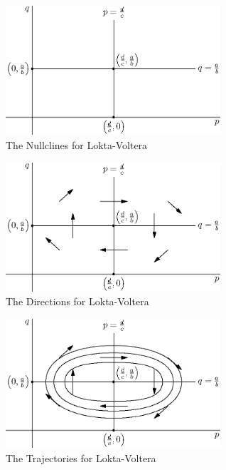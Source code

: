 \documentclass[fleqn,letterpaper]{report}
\begin{document}
\begin{figure}[t]
\centering
\includegraphics[width=8cm]{figure24.eps}
\caption{The Nullclines for Lokta-Voltera}
\label{figure-nullclines-lokta-voltera}
\end{figure}

\begin{figure}[t]
\centering
\includegraphics[width=8cm]{figure25.eps}
\caption{The Directions for Lokta-Voltera}
\label{figure-directions-lokta-voltera}
\end{figure}

\begin{figure}[t]
\centering
\includegraphics[width=8cm]{figure26.eps}
\caption{The Trajectories for Lokta-Voltera}
\label{figure-trajectories-lokta-voltera}
\end{figure}
\end{document}
